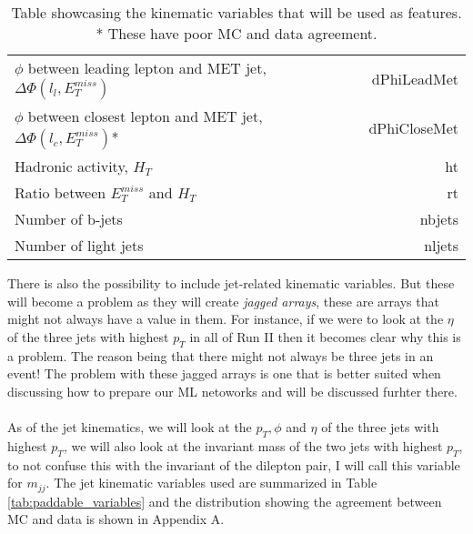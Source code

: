 \documentclass[14pt, a4paper]{book}
\begin{document}
\begin{table}[!h]
\begin{tabular}{l|r}
        $\phi$ between leading lepton and MET jet, $\Delta\Phi(l_l,E_T^{miss})$         & dPhiLeadMet \\
        $\phi$ between closest lepton and MET jet, $\Delta\Phi(l_c,E_T^{miss})$*        & dPhiCloseMet \\
        Hadronic activity, $H_T$                                                        & ht\\
        Ratio between $E_T^{miss}$ and $H_T$                                            & rt\\
        Number of b-jets                                                                & nbjets         \\
        Number of light jets                                                            & nljets         \\\midrule\midrule
    \end{tabular}
    \caption[Kinematic variables used as features]{Table showcasing the kinematic variables that will be used as features.\\ * These have poor MC and data agreement.}
    \label{tab:variables}
\end{table}
\clearpage\noindent There is also the possibility to include jet-related kinematic variables. But these will become a problem as they will create \textit{jagged arrays}, these are arrays that might not always have a value in them.
For instance, if we were to look at the $\eta$ of the three jets with highest $p_T$ in all of Run II then it becomes clear why this is a problem. The reason being that there might not always be three jets in an event!
The problem with these jagged arrays is one that is better suited when discussing how to prepare our ML netoworks and will be discussed furhter there. \\
\\As of the jet kinematics, we will look at the $p_T, \phi$ and $\eta$ of the three jets with highest $p_T$, we will also look at the invariant mass of the two jets with highest $p_T$, 
to not confuse this with the invariant of the dilepton pair, I will call this variable for $m_{jj}$. The jet kinematic variables used are summarized in Table \ref{tab:paddable_variables} 
and the distribution showing the agreement between MC and data is shown in Appendix A.
\end{document}
